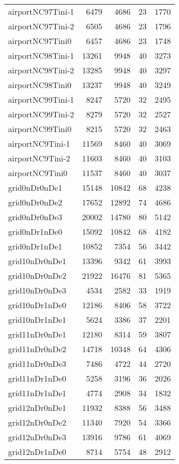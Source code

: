 \begin{tabular}{lrrrr}
airportNC97Tini-1 & 6479 & 4686 & 23 & 1770 \\
airportNC97Tini-2 & 6505 & 4686 & 23 & 1796 \\
airportNC97Tini0 & 6457 & 4686 & 23 & 1748 \\
airportNC98Tini-1 & 13261 & 9948 & 40 & 3273 \\
airportNC98Tini-2 & 13285 & 9948 & 40 & 3297 \\
airportNC98Tini0 & 13237 & 9948 & 40 & 3249 \\
airportNC99Tini-1 & 8247 & 5720 & 32 & 2495 \\
airportNC99Tini-2 & 8279 & 5720 & 32 & 2527 \\
airportNC99Tini0 & 8215 & 5720 & 32 & 2463 \\
airportNC9Tini-1 & 11569 & 8460 & 40 & 3069 \\
airportNC9Tini-2 & 11603 & 8460 & 40 & 3103 \\
airportNC9Tini0 & 11537 & 8460 & 40 & 3037 \\
grid0nDr0nDe1 & 15148 & 10842 & 68 & 4238 \\
grid0nDr0nDe2 & 17652 & 12892 & 74 & 4686 \\
grid0nDr0nDe3 & 20002 & 14780 & 80 & 5142 \\
grid0nDr1nDe0 & 15092 & 10842 & 68 & 4182 \\
grid0nDr1nDe1 & 10852 & 7354 & 56 & 3442 \\
grid10nDr0nDe1 & 13396 & 9342 & 61 & 3993 \\
grid10nDr0nDe2 & 21922 & 16476 & 81 & 5365 \\
grid10nDr0nDe3 & 4534 & 2582 & 33 & 1919 \\
grid10nDr1nDe0 & 12186 & 8406 & 58 & 3722 \\
grid10nDr1nDe1 & 5624 & 3386 & 37 & 2201 \\
grid11nDr0nDe1 & 12180 & 8314 & 59 & 3807 \\
grid11nDr0nDe2 & 14718 & 10348 & 64 & 4306 \\
grid11nDr0nDe3 & 7486 & 4722 & 44 & 2720 \\
grid11nDr1nDe0 & 5258 & 3196 & 36 & 2026 \\
grid11nDr1nDe1 & 4774 & 2908 & 34 & 1832 \\
grid12nDr0nDe1 & 11932 & 8388 & 56 & 3488 \\
grid12nDr0nDe2 & 11340 & 7920 & 54 & 3366 \\
grid12nDr0nDe3 & 13916 & 9786 & 61 & 4069 \\
grid12nDr1nDe0 & 8714 & 5754 & 48 & 2912 \\

\end{tabular}
